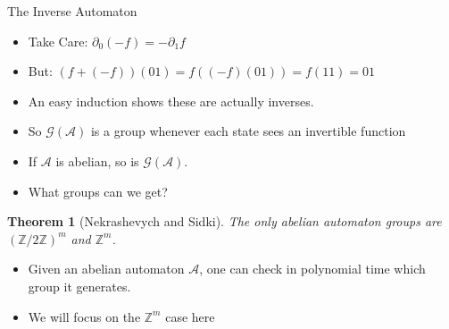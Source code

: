 \documentclass{beamer}
\newtheorem{thm}{Theorem}
\newcommand{\2}{\textbf{2}}
\newcommand{\A}{\mathcal{A}}
\newcommand{\G}{\mathcal{G}}
\newcommand{\Z}{\mathbb{Z}}
\newcommand{\del}{\partial}
\begin{document}
\begin{frame}{The Inverse Automaton}
  \pause

  \begin{itemize}
    \item Take Care: $\del_0 (-f) = -\del_1 f$
    \pause
    \item But: $(f + (-f))(01) = f((-f)(01)) = f(11) = 01$ 
    \pause
    \item An easy induction shows these are actually inverses.
  \end{itemize}
\end{frame}

\begin{frame}
  \begin{itemize}
    \item So $\G(\A)$ is a group whenever each state sees an invertible function
    \pause
    \item If $\A$ is abelian, so is $\G(\A)$.
    \pause
    \item What groups can we get?
  \end{itemize}
  \pause
  \begin{thm}[Nekrashevych and Sidki]
    The only abelian automaton groups are $(\Z/2\Z)^m$ and $\Z^m$.
  \end{thm}
  \pause
  \begin{itemize}
    \item Given an abelian automaton $\A$, one can check in polynomial
      time which group it generates.
    \pause
    \item We will focus on the $\Z^m$ case here
  \end{itemize}
\end{frame}
\end{document}
